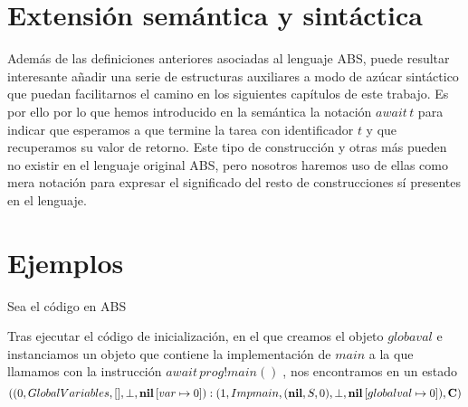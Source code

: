 \begin{landscape}
  \begin{prooftree*}
  \end{prooftree*}

  \begin{prooftree*}
  \end{prooftree*}

  \begin{prooftree*}
  \end{prooftree*}

\end{landscape}

\section{Extensión semántica y sintáctica}

Además de las definiciones anteriores asociadas al lenguaje ABS, puede resultar interesante añadir una serie de estructuras auxiliares a modo de azúcar sintáctico que puedan facilitarnos el camino en los siguientes capítulos de este trabajo. Es por ello por lo que hemos introducido en la semántica la notación $await\,t$ para indicar que esperamos a que termine la tarea con identificador $t$ y que recuperamos su valor de retorno. Este tipo de construcción y otras más pueden no existir en el lenguaje original ABS, pero nosotros haremos uso de ellas como mera notación para expresar el significado del resto de construcciones sí presentes en el lenguaje.\\

\section{Ejemplos}

Sea el código en ABS


Tras ejecutar el código de inicialización, en el que creamos el objeto $globaval$ e instanciamos un objeto que contiene la implementación de $main$ a la que llamamos con la instrucción $await\, prog!main()\;$, nos encontramos en un estado
$$
((0, GlobalVariables, [], \perp, \textbf{nil}\left[ var\mapsto0 \right]):(1, Impmain, (\textbf{nil}, S, 0), \perp, \textbf{nil}\left[ globalval\mapsto0 \right]), \mathbf{C})
$$

